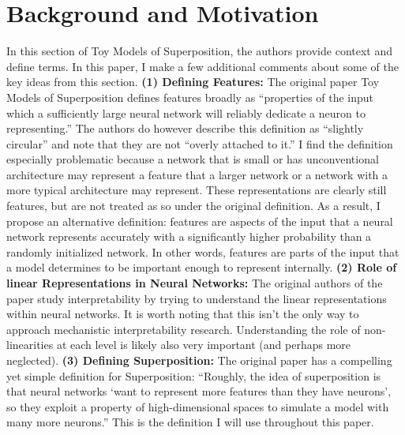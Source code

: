 \documentclass{article} %
\begin{document}
\section{Background and Motivation}
In this section of Toy Models of Superposition\cite{elhage2022toy}, the authors
provide context and define terms.  In this paper, I make a few additional comments 
about some of the key ideas from this section. \newline \newline
\textbf{(1) Defining Features: }The original paper Toy Models of Superposition
defines features broadly as ``properties of the input which a sufficiently large 
neural network will reliably dedicate a neuron to representing.'' The authors do
however describe this definition as ``slightly circular'' and note that they are
not ``overly attached to it.'' I find the definition especially problematic because a network that is small or
has unconventional architecture may represent a feature that a larger network
or a network with a more typical architecture may represent. These 
representations are clearly still features, but are not treated as so under the
original definition.\newline\newline
As a result, I propose an alternative definition: features are aspects of the
input that a neural network represents accurately with a significantly higher probability than 
a randomly initialized network. In other words, features are parts of the input 
that a model determines to be important enough to represent internally.\newline\newline
\textbf{(2) Role of linear Representations in Neural Networks: }The original authors
of the paper study interpretability by trying to understand the linear representations
within neural networks. It is worth noting that this isn't the only way to approach
mechanistic interpretability research. Understanding the role of non-linearities 
at each level is likely also very important (and perhaps more neglected).\newline\newline
\textbf{(3) Defining Superposition: } The original paper has a compelling yet
simple definition for Superposition: ``Roughly, the idea of 
superposition is that neural networks `want to represent more features than they 
have neurons', so they exploit a property of high-dimensional spaces to 
simulate a model with many more neurons.'' This is the definition I will use
throughout this paper.
\end{document}
